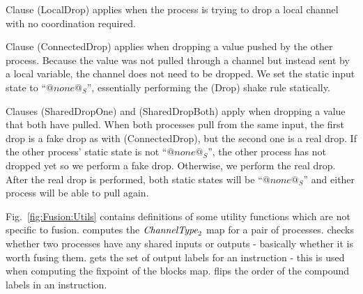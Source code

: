 Clause (LocalDrop) applies when the process is trying to drop a local channel with no coordination required.

Clause (ConnectedDrop) applies when dropping a value pushed by the other process.
Because the value was not pulled through a channel but instead sent by a local variable, the channel does not need to be dropped.
We set the static input state to ``$@none@_S$'', essentially performing the (Drop) shake rule statically.

Clauses (SharedDropOne) and (SharedDropBoth) apply when dropping a value that both have pulled.
When both processes pull from the same input, the first drop is a fake drop as with (ConnectedDrop), but the second one is a real drop.
If the other process' static state is not ``$@none@_S$'', the other process has not dropped yet so we perform a fake drop.
Otherwise, we perform the real drop.
After the real drop is performed, both static states will be ``$@none@_S$'' and either process will be able to pull again.



Fig.~\ref{fig:Fusion:Utils} contains definitions of some utility functions which are not specific to fusion.
 computes the $\textit{ChannelType}_2$ map for a pair of processes.
 checks whether two processes have any shared inputs or outputs - basically whether it is worth fusing them.
 gets the set of output labels for an instruction - this is used when computing the fixpoint of the blocks map.
 flips the order of the compound labels in an instruction.
